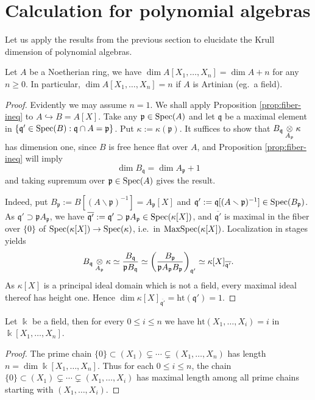\section{Calculation for polynomial algebras}
Let us apply the results from the previous section to elucidate the Krull dimension of polynomial algebras.

\begin{theorem}\label{prop:dim-polynomial-alg}
	Let $A$ be a Noetherian ring, we have $\dim A[X_1, \ldots, X_n] = \dim A + n$ for any $n \geq 0$. In particular, $\dim A[X_1, \ldots, X_n] = n$ if $A$ is Artinian (eg.\ a field).
\end{theorem}
\begin{proof}
	Evidently we may assume $n=1$. We shall apply Proposition \ref{prop:fiber-ineq} to $A \hookrightarrow B = A[X]$. Take any $\mathfrak{p} \in \operatorname{Spec}(A)$ and let $\mathfrak{q}$ be a maximal element in $\{\mathfrak{q}' \in \operatorname{Spec}(B): \mathfrak{q} \cap A = \mathfrak{p} \}$. Put $\kappa := \kappa(\mathfrak{p})$. It suffices to show that $B_{\mathfrak{q}} \underset{A_{\mathfrak{p}}}{\otimes} \kappa$ has dimension one, since $B$ is free hence flat over $A$, and Proposition \ref{prop:fiber-ineq} will imply
	\[ \dim B_{\mathfrak{q}} = \dim A_{\mathfrak{p}} + 1 \]
	and taking supremum over $\mathfrak{p} \in \operatorname{Spec}(A)$ gives the result.
	
	Indeed, put $B_{\mathfrak{p}} := B[(A \smallsetminus \mathfrak{p})^{-1}] = A_{\mathfrak{p}}[X]$ and $\mathfrak{q}' := \mathfrak{q}[(A \smallsetminus \mathfrak{p})^{-1}] \in \operatorname{Spec}(B_{\mathfrak{p}})$. As $\mathfrak{q}' \supset \mathfrak{p}A_{\mathfrak{p}}$, we have $\overline{\mathfrak{q}'} := \mathfrak{q}' \supset \mathfrak{p}A_{\mathfrak{p}} \in \operatorname{Spec}(\kappa[X])$, and $\overline{\mathfrak{q}'}$ is maximal in the fiber over $\{0\}$ of $\operatorname{Spec}(\kappa[X]) \to \operatorname{Spec}(\kappa)$, i.e.\ in $\operatorname{MaxSpec}(\kappa[X])$. Localization in stages yields
	\[ B_{\mathfrak{q}} \underset{A_{\mathfrak{p}}}{\otimes} \kappa \simeq \frac{B_{\mathfrak{q}}}{\mathfrak{p} B_{\mathfrak{q}}} \simeq \left( \frac{B_{\mathfrak{p}}}{ \mathfrak{p} A_{\mathfrak{p}} B_{\mathfrak{p}}} \right)_{\mathfrak{q}' } \simeq \kappa[X]_{\overline{\mathfrak{q}'}}. \]
	As $\kappa[X]$ is a principal ideal domain which is not a field, every maximal ideal thereof has height one. Hence $\dim \kappa[X]_{\overline{\mathfrak{q'}}} = \mathrm{ht}(\mathfrak{q}') = 1$.
\end{proof}

\begin{corollary}\label{prop:poly-alg-ht}
	Let $\Bbbk$ be a field, then for every $0 \leq i \leq n$ we have $\mathrm{ht}(X_1, \ldots, X_i) = i$ in $\Bbbk[X_1, \ldots, X_n]$.
\end{corollary}
\begin{proof}
	The prime chain $\{0\} \subset (X_1) \subsetneq \cdots \subsetneq (X_1, \ldots, X_n)$ has length $n = \dim \Bbbk[X_1, \ldots, X_n]$. Thus for each $0 \leq i \leq n$, the chain $\{0\} \subset (X_1) \subsetneq \cdots \subsetneq (X_1, \ldots, X_i)$ has maximal length among all prime chains starting with $(X_1, \ldots, X_i)$.
\end{proof}

